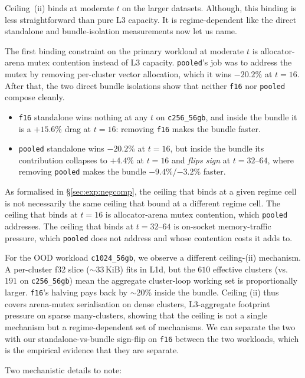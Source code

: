 Ceiling~(ii) binds at moderate $t$ on the larger datasets. Although, this binding is less straightforward than pure L3 capacity. It is regime-dependent like the direct standalone and bundle-isolation measurements now let us name.

The first binding constraint on the  primary workload at moderate $t$ is allocator-arena mutex contention instead of L3 capacity. \texttt{pooled}'s job was to address the mutex by removing per-cluster vector allocation, which it wins $-20.2\%$ at $t{=}16$. After that, the two direct bundle isolations show that neither \texttt{f16} nor \texttt{pooled} compose cleanly.

\begin{itemize}
  \item \texttt{f16} standalone wins nothing at any $t$ on \texttt{c256\_56gb}, and inside the bundle it is a $+15.6\%$ drag at $t{=}16$: removing \texttt{f16} makes the bundle faster.
  \item \texttt{pooled} standalone wins $-20.2\%$ at $t{=}16$, but inside the bundle its contribution collapses to $+4.4\%$ at $t{=}16$ and \emph{flips sign} at $t{=}32$--$64$, where removing \texttt{pooled} makes the bundle $-9.4\%$/$-3.2\%$ faster.
\end{itemize}

As formalised in §\ref{sec:exp:negcomp}, the ceiling that binds at a given regime cell is not necessarily the same ceiling that bound at a different regime cell. The ceiling that binds at $t{=}16$ is allocator-arena mutex contention, which \texttt{pooled} addresses. The ceiling that binds at $t{=}32$--$64$ is on-socket memory-traffic pressure, which \texttt{pooled} does not address and whose contention costs it adds to.

For the OOD workload \texttt{c1024\_56gb}, we observe a different ceiling-(ii) mechanism. A per-cluster f32 slice ($\sim\!33$\,KiB) fits in L1d, but the $610$ effective clusters (vs.\ $191$ on \texttt{c256\_56gb}) mean the aggregate cluster-loop working set is proportionally larger. \texttt{f16}'s halving pays back by $\sim\!20\%$ inside the bundle. Ceiling (ii) thus covers arena-mutex serialisation on dense clusters, L3-aggregate footprint pressure on sparse many-clusters, showing that the ceiling is not a single mechanism but a regime-dependent set of mechanisms. We can separate the two with our standalone-vs-bundle sign-flip on \texttt{f16} between the two workloads, which is the empirical evidence that they are separate.

Two mechanistic details to note:

